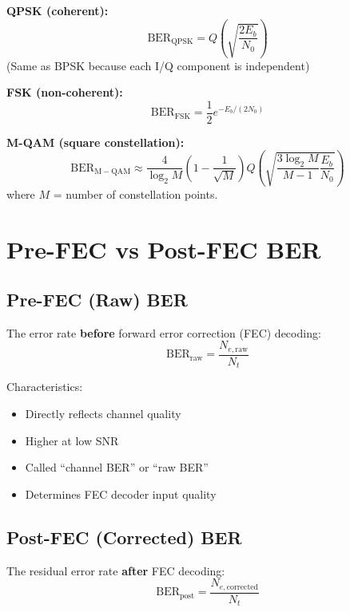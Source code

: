 \textbf{QPSK (coherent):}
\begin{equation}
\mathrm{BER}_{\mathrm{QPSK}} = Q\left(\sqrt{\frac{2E_b}{N_0}}\right)
\label{eq:ber-qpsk}
\end{equation}
(Same as BPSK because each I/Q component is independent)

\textbf{FSK (non-coherent):}
\begin{equation}
\mathrm{BER}_{\mathrm{FSK}} = \frac{1}{2}e^{-E_b/(2N_0)}
\label{eq:ber-fsk}
\end{equation}

\textbf{M-QAM (square constellation):}
\begin{equation}
\mathrm{BER}_{\mathrm{M-QAM}} \approx \frac{4}{\log_2 M}\left(1 - \frac{1}{\sqrt{M}}\right)Q\left(\sqrt{\frac{3\log_2 M}{M-1}\frac{E_b}{N_0}}\right)
\label{eq:ber-mqam}
\end{equation}
where $M$ = number of constellation points.

\section{Pre-FEC vs Post-FEC BER}

\subsection{Pre-FEC (Raw) BER}

The error rate \textbf{before} forward error correction (FEC) decoding:
\begin{equation}
\mathrm{BER}_{\mathrm{raw}} = \frac{N_{e,\mathrm{raw}}}{N_t}
\label{eq:ber-raw}
\end{equation}

Characteristics:
\begin{itemize}
\item Directly reflects channel quality
\item Higher at low SNR
\item Called ``channel BER'' or ``raw BER''
\item Determines FEC decoder input quality
\end{itemize}

\subsection{Post-FEC (Corrected) BER}

The residual error rate \textbf{after} FEC decoding:
\begin{equation}
\mathrm{BER}_{\mathrm{post}} = \frac{N_{e,\mathrm{corrected}}}{N_t}
\label{eq:ber-post}
\end{equation}

